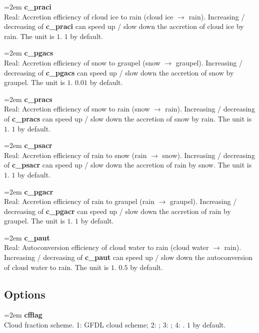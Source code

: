 \documentclass[letterpaper,titlepage,10pt]{article}
\numberwithin{equation}{section}
\begin{document}
\begin{appendices}
\hangindent=2em
\textbf{c\_praci}\\ Real: Accretion efficiency of cloud ice to rain (cloud ice $\rightarrow$ rain). Increasing / decreasing of \textbf{c\_praci} can speed up / slow down the accretion of cloud ice by rain. The unit is $1$. $1$ by default.

\hangindent=2em
\textbf{c\_pgacs}\\ Real: Accretion efficiency of snow to graupel (snow $\rightarrow$ graupel). Increasing / decreasing of \textbf{c\_pgacs} can speed up / slow down the accretion of snow by graupel. The unit is $1$. $0.01$ by default.

\hangindent=2em
\textbf{c\_pracs}\\ Real: Accretion efficiency of snow to rain (snow $\rightarrow$ rain). Increasing / decreasing of \textbf{c\_pracs} can speed up / slow down the accretion of snow by rain. The unit is $1$. $1$ by default.

\hangindent=2em
\textbf{c\_psacr}\\ Real: Accretion efficiency of rain to snow (rain $\rightarrow$ snow). Increasing / decreasing of \textbf{c\_psacr} can speed up / slow down the accretion of rain by snow. The unit is $1$. $1$ by default.

\hangindent=2em
\textbf{c\_pgacr}\\ Real: Accretion efficiency of rain to graupel (rain $\rightarrow$ graupel). Increasing / decreasing of \textbf{c\_pgacr} can speed up / slow down the accretion of rain by graupel. The unit is $1$. $1$ by default.

\hangindent=2em
\textbf{c\_paut}\\ Real: Autoconversion efficiency of cloud water to rain (cloud water $\rightarrow$ rain). Increasing / decreasing of \textbf{c\_paut} can speed up / slow down the autoconversion of cloud water to rain.  The unit is $1$. $0.5$ by default.


\subsection{Options}

\hangindent=2em
\textbf{cfflag}\\ Cloud fraction scheme. 1: GFDL cloud scheme; 2: \citet{xu1996asem}; 3: \citet{park2016arev}; 4: \citet{gultepe2007clou}. $1$ by default.


\end{appendices}
\end{document}
